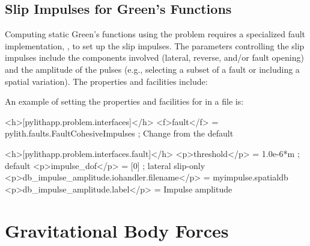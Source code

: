 \subsection{Slip Impulses for Green's Functions}
\label{sec:fault:cohesive:impulses}

Computing static Green's functions using the  problem requires
a specialized fault implementation, , to set
up the slip impulses. The parameters controlling the slip impulses
include the components involved (lateral, reverse, and/or fault opening)
and the amplitude of the pulses (e.g., selecting a subset of a fault
or including a spatial variation). The  properties and facilities
include:
\begin{inventory}
\end{inventory}
An example of setting the properties and facilities for 
in a  file is:
\begin{cfg}
<h>[pylithapp.problem.interfaces]</h>
<f>fault</f> = pylith.faults.FaultCohesiveImpulses ; Change from the default 

<h>[pylithapp.problem.interfaces.fault]</h>
<p>threshold</p> = 1.0e-6*m ; default
<p>impulse_dof</p> = [0] ; lateral slip-only
<p>db_impulse_amplitude.iohandler.filename</p> = myimpulse.spatialdb
<p>db_impulse_amplitude.label</p> = Impulse amplitude
\end{cfg}

\section{Gravitational Body Forces}

